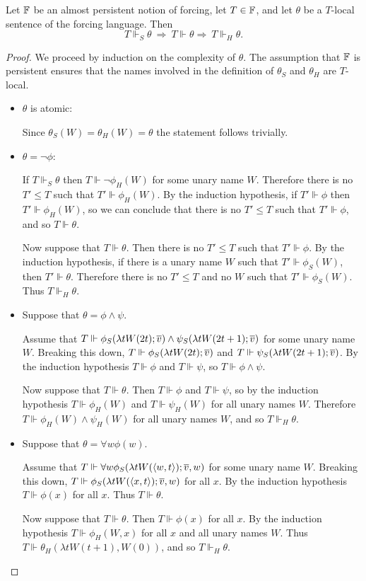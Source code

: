 \begin{prop}[\RCAo]\label{P:easySkolemEquiv}
Let $\mathbb{F}$ be an almost persistent notion of forcing,
let $T\in\mathbb{F}$, and let $\theta$ be a $T$-local sentence of the forcing language.
Then
$$T\Vdash_S\theta\ \Rightarrow\ T\Vdash\theta \Rightarrow\ T\Vdash_H\theta.$$
\end{prop}
\begin{proof}
We proceed by induction on the complexity of $\theta$.
The assumption that $\mathbb{F}$ is persistent ensures that
the names involved in the definition of $\theta_S$ and $\theta_H$ are $T$-local.

\begin{itemize}

\item $\theta$ is atomic:

Since $\theta_S(W)=\theta_H(W)=\theta$ the statement follows trivially.

\item $\theta=\neg\phi$:

If $T\Vdash_S\theta$ then $T\Vdash \neg\phi_H(W)$ for some unary name $W$.
Therefore there is no $T'\leq T$ such that $T'\Vdash\phi_H(W)$.
By the induction hypothesis, if $T'\Vdash\phi$ then $T'\Vdash\phi_H(W)$,
so we can conclude that there is no $T'\leq T$ such that
$T'\Vdash\phi$, and so $T\Vdash\theta$.

Now suppose that $T\Vdash\theta$.
Then there is no $T'\leq T$ such that $T'\Vdash\phi$.
By the induction hypothesis, if there is a unary name $W$ such that
$T'\Vdash\phi_S(W)$, then $T'\Vdash\theta$.
Therefore there is no $T'\leq T$ and no $W$ such that $T'\Vdash\phi_S(W)$.
Thus $T\Vdash_H\theta$.

\item Suppose that $\theta=\phi\land\psi$.

Assume that $T\Vdash \phi_S(\lambda tW(2t);\overline{v})\land\psi_S(\lambda tW(2t+1);\overline{v})$
for some unary name $W$.
Breaking this down, $T\Vdash\phi_S(\lambda tW(2t);\overline{v})$ and $T\Vdash\psi_S(\lambda tW(2t+1);\overline{v})$.
By the induction hypothesis $T\Vdash\phi$ and $T\Vdash\psi$, so $T\Vdash\phi\land\psi$.

Now suppose that $T\Vdash\theta$.
Then $T\Vdash\phi$ and $T\Vdash\psi$, so by the induction hypothesis
$T\Vdash\phi_H(W)$ and $T\Vdash\psi_H(W)$ for all unary names $W$.
Therefore $T\Vdash\phi_H(W)\land\psi_H(W)$ for all unary names $W$,
and so $T\Vdash_H\theta$.

\item Suppose that $\theta=\forall w\phi(w)$.

Assume that $T\Vdash \forall w\phi_S(\lambda tW(\langle w,t\rangle);\overline{v},w)$
for some unary name $W$.
Breaking this down, $T\Vdash\phi_S(\lambda tW(\langle x,t\rangle);\overline{v},w)$ for all $x$.
By the induction hypothesis $T\Vdash\phi(x)$ for all $x$.
Thus $T\Vdash\theta$.

Now suppose that $T\Vdash\theta$.
Then $T\Vdash\phi(x)$ for all $x$.
By the induction hypothesis $T\Vdash\phi_H(W,x)$ for all $x$ and all unary names $W$.
Thus $T\Vdash\theta_H(\lambda tW(t+1),W(0))$,
and so $T\Vdash_H\theta$.
\end{itemize}
\end{proof}

